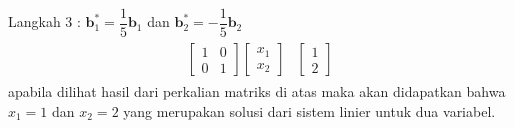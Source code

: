 	Langkah 3 : $\textbf{b}^*_1= \dfrac{1}{5}\textbf{b}_1 $ dan $\textbf{b}^*_2= -\dfrac{1}{5}\textbf{b}_2$ \\
	\begin{align*}
	\begin{array}{r|r} 
		\left[
		\begin{array}{rr} 
			1 & 0 \\
			0 & 1 
		\end{array} 
		\right] \left[
		\begin{array}{r} 
			x_1 \\ 
			x_2  
		\end{array}
		\right]  &  \left[
		\begin{array}{r} 
			1\\
			2 
		\end{array} 
		\right]
	\end{array}
\end{align*}
	apabila dilihat hasil dari perkalian matriks di atas maka akan didapatkan bahwa $x_1=1$ dan $x_2=2$ yang merupakan solusi dari sistem linier untuk dua variabel.\\
	
